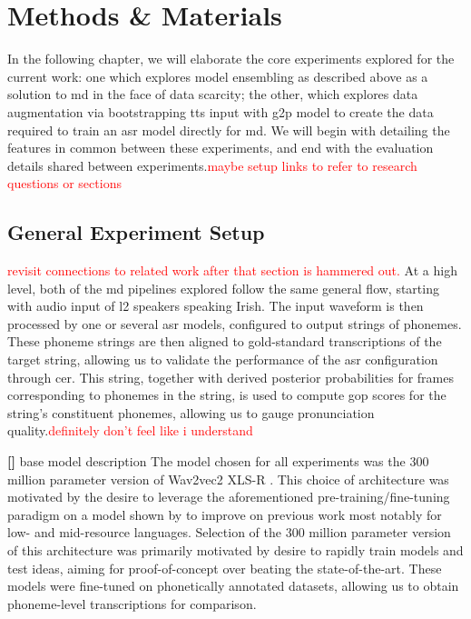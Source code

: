 \documentclass[thesis]{cluu}
\newcounter{paranum}
\newcommand{\numberedparagraph}{\par\refstepcounter{paranum}\textbf{[\theparanum] }}
\newcommand{\todo}[1]{\textcolor{red}{#1}}
\begin{document}
\chapter{Methods \& Materials}
In the following chapter, we will elaborate the core experiments explored for the current work: one which explores model ensembling as described above as a solution to \gls{md} in the face of data scarcity; the other, which explores data augmentation via bootstrapping \gls{tts} input with \gls{g2p} model to create the data required to train an \gls{asr} model directly for \gls{md}. We will begin with detailing the features in common between these experiments, and end with the evaluation details shared between experiments.\todo{maybe setup links to refer to research questions or sections}
\section{General Experiment Setup}
\todo{revisit connections to related work after that section is hammered out.}
At a high level, both of the \gls{md} pipelines explored follow the same general flow, starting with audio input of \gls{l2} speakers speaking Irish. The input waveform is then processed by one or several \gls{asr} models, configured to output strings of phonemes. These phoneme strings are then aligned to gold-standard transcriptions of the target string, allowing us to validate the performance of the \gls{asr} configuration through \gls{cer}. This string, together with derived posterior probabilities for frames corresponding to phonemes in the string, is used to compute \gls{gop} scores for the string's constituent phonemes, allowing us to gauge pronunciation quality.\todo{definitely don't feel like i understand }

\numberedparagraph{base model description}
The model chosen for all experiments was the 300 million parameter version of Wav2vec2 XLS-R \parencite{babuXLSRSelfsupervisedCrosslingual2021}. This choice of architecture was motivated by the desire to leverage the aforementioned pre-training/fine-tuning paradigm on a model shown by \textcite{babuXLSRSelfsupervisedCrosslingual2021} to improve on previous work most notably for low- and mid-resource languages. Selection of the 300 million parameter version of this architecture was primarily motivated by desire to rapidly train models and test ideas, aiming for proof-of-concept over beating the state-of-the-art. These models were fine-tuned on phonetically annotated datasets, allowing us to obtain phoneme-level transcriptions for comparison.
\end{document}

